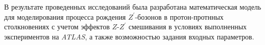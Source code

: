 В результате проведенных исследований была разработана
математическая модель для моделирования процесса рождения ${Z}^{\prime}$-бозонов в протон-протнных столкновениях с учетом эффектов $Z$-${Z}^{\prime}$ смешивания в условиях выполненных экспериментов на \textit{ATLAS}, а также
возможностью задания входных параметров.